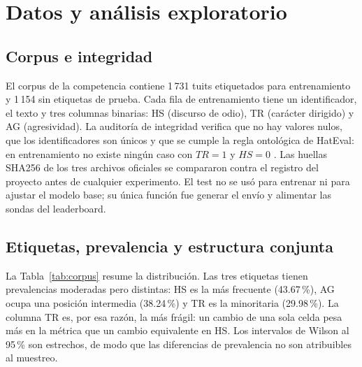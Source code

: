 \section{Datos y análisis exploratorio}
\label{sec:datos}

\subsection{Corpus e integridad}

El corpus de la competencia contiene 1\,731 tuits etiquetados para
entrenamiento y 1\,154 sin etiquetas de prueba. Cada fila de entrenamiento tiene un
identificador, el texto y tres columnas binarias: HS (discurso de odio), TR
(carácter dirigido) y AG (agresividad). La auditoría de integridad verifica
que no hay valores nulos, que los identificadores son únicos y que se cumple
la regla ontológica de HatEval: en entrenamiento no existe ningún caso con
$TR=1$ y $HS=0$ \cite{basile2019hateval}. Las huellas SHA256 de los tres
archivos oficiales se compararon contra el registro del proyecto antes de
cualquier experimento. El test no se usó para entrenar ni para ajustar el modelo base;
su única función fue generar el envío y alimentar las sondas del leaderboard.

\subsection{Etiquetas, prevalencia y estructura conjunta}

La Tabla~\ref{tab:corpus} resume la distribución. Las tres etiquetas tienen
prevalencias moderadas pero distintas: HS es la más frecuente (43.67\,\%),
AG ocupa una posición intermedia (38.24\,\%) y TR es la minoritaria
(29.98\,\%). La columna TR es, por esa razón, la más frágil: un cambio de una
sola celda pesa más en la métrica que un cambio equivalente en HS. Los
intervalos de Wilson al 95\,\% \cite{wilson1927probable} son estrechos, de
modo que las diferencias de prevalencia no son atribuibles al muestreo.


